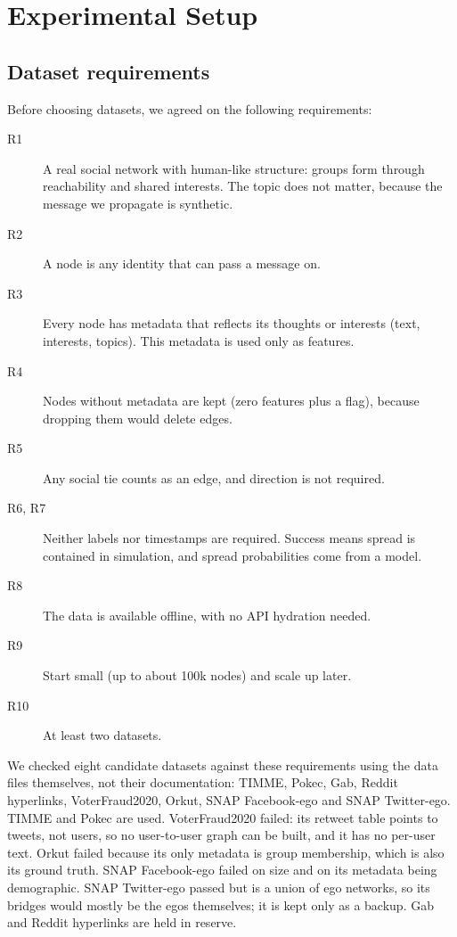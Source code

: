 \section{Experimental Setup}
\label{sec:setup}

\subsection{Dataset requirements}
\label{sec:setup-requirements}
Before choosing datasets, we agreed on the following requirements:
\begin{description}
  \item[R1] A real social network with human-like structure: groups form through
            reachability and shared interests. The topic does not matter, because the
            message we propagate is synthetic.
  \item[R2] A node is any identity that can pass a message on.
  \item[R3] Every node has metadata that reflects its thoughts or interests (text,
            interests, topics). This metadata is used only as features.
  \item[R4] Nodes without metadata are kept (zero features plus a flag), because
            dropping them would delete edges.
  \item[R5] Any social tie counts as an edge, and direction is not required.
  \item[R6, R7] Neither labels nor timestamps are required. Success means spread is
            contained in simulation, and spread probabilities come from a model.
  \item[R8] The data is available offline, with no API hydration needed.
  \item[R9] Start small (up to about 100k nodes) and scale up later.
  \item[R10] At least two datasets.
\end{description}
We checked eight candidate datasets against these requirements using the data files
themselves, not their documentation: TIMME, Pokec, Gab, Reddit hyperlinks,
VoterFraud2020, Orkut, SNAP Facebook-ego and SNAP Twitter-ego. TIMME and Pokec are
used. VoterFraud2020 failed: its retweet table points
to tweets, not users, so no user-to-user graph can be built, and it has no per-user
text. Orkut failed because its only metadata is group membership, which is also its
ground truth. SNAP Facebook-ego failed on size and on its metadata being demographic.
SNAP Twitter-ego passed but is a union of ego networks, so its bridges would mostly be
the egos themselves; it is kept only as a backup. Gab and Reddit hyperlinks are held in
reserve.

